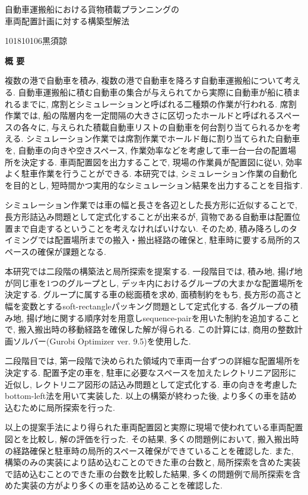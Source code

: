 \begin{center}
\begin{spacing}{1.3}
    {\LARGE 自動車運搬船における貨物積載プランニングの\\車両配置計画に対する構築型解法}\\[0.5cm]
\end{spacing}
\end{center}
\hfill
{\large 101810106\qquad 黒須諒}\\[0.5cm]
\begin{center}
{\Large \bf 概 要}\\
\end{center}

複数の港で自動車を積み, 複数の港で自動車を降ろす自動車運搬船について考える. 
自動車運搬船に積む自動車の集合が与えられてから実際に自動車が船に積まれるまでに, 席割とシミュレーションと呼ばれる二種類の作業が行われる. 
席割作業では, 船の階層内を一定間隔の大きさに区切ったホールドと呼ばれるスペースの各々に, 与えられた積載自動車リストの自動車を何台割り当てられるかを考える. 
シミュレーション作業では席割作業でホールド毎に割り当てられた自動車を, 自動車の向きや空きスペース, 作業効率などを考慮して車一台一台の配置場所を決定する. 
車両配置図を出力することで, 現場の作業員が配置図に従い, 効率よく駐車作業を行うことができる. 
本研究では, シミュレーション作業の自動化を目的とし, 短時間かつ実用的なシミュレーション結果を出力することを目指す. 

シミュレーション作業では車の幅と長さを各辺とした長方形に近似することで, 長方形詰込み問題として定式化することが出来るが, 貨物である自動車は配置位置まで自走するということを考えなければいけない. 
そのため, 積み降ろしのタイミングでは配置場所までの搬入・搬出経路の確保と, 駐車時に要する局所的スペースの確保が課題となる. 

本研究では二段階の構築法と局所探索を提案する. 
一段階目では, 積み地, 揚げ地が同じ車を1つのグループとし, デッキ内におけるグループの大まかな配置場所を決定する. 
グループに属する車の総面積を求め, 面積制約をもち, 長方形の高さと幅を変数とするsoft-rectangleパッキング問題として定式化する. 
各グループの積み地, 揚げ地に関する順序対を用意しsequence-pairを用いた制約を追加することで, 搬入搬出時の移動経路を確保した解が得られる. 
この計算には, 商用の整数計画ソルバー(Gurobi Optimizer ver. 9.5)を使用した.  

二段階目では, 第一段階で決められた領域内で車両一台ずつの詳細な配置場所を決定する. 
配置予定の車を, 駐車に必要なスペースを加えたレクトリニア図形に近似し, レクトリニア図形の詰込み問題として定式化する. 
車の向きを考慮したbottom-left法を用いて実装した. 
以上の構築が終わった後, より多くの車を詰め込むために局所探索を行った.  

以上の提案手法により得られた車両配置図と実際に現場で使われている車両配置図とを比較し, 解の評価を行った. 
その結果, 多くの問題例において, 搬入搬出時の経路確保と駐車時の局所的スペース確保ができていることを確認した. 
また, 構築のみの実装により詰め込むことのできた車の台数と, 局所探索を含めた実装で詰め込むことのできた車の台数を比較した結果, 多くの問題例で局所探索を含めた実装の方がより多くの車を詰め込めることを確認した. 

